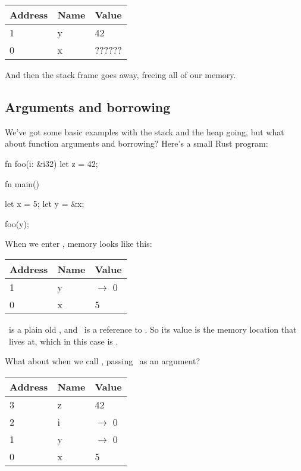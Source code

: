 \begin{table}[H]
  \begin{tabular}{|l|l|l|}
    \hline
    \textbf{Address} & \textbf{Name} & \textbf{Value} \\
    \hline
    1 & y & 42 \\
    \hline
    0 & x & ?????? \\
    \hline
  \end{tabular}
\end{table}

And then the stack frame goes away, freeing all of our memory.

\subsection*{Arguments and borrowing}

We've got some basic examples with the stack and the heap going, but what about function arguments and borrowing? Here's a small 
Rust program:

\begin{rustc}
fn foo(i: &i32) {
    let z = 42;
}

fn main() {
    let x = 5;
    let y = &x;

    foo(y);
}
\end{rustc}

When we enter , memory looks like this:

\begin{table}[H]
  \begin{tabular}{|l|l|l|}
    \hline
    \textbf{Address} & \textbf{Name} & \textbf{Value} \\
    \hline
    1 & y & $\rightarrow$ 0 \\
    \hline
    0 & x & 5 \\
    \hline
  \end{tabular}
\end{table}

\x\ is a plain old , and \y\ is a reference to \x. So its value is the memory location that \x\ lives at, which in this 
case is .

\blank

What about when we call , passing \y\ as an argument?

\begin{table}[H]
  \begin{tabular}{|l|l|l|}
    \hline
    \textbf{Address} & \textbf{Name} & \textbf{Value} \\
    \hline
    3 & z & 42 \\
    \hline
    2 & i & $\rightarrow$ 0 \\
    \hline
    1 & y & $\rightarrow$ 0 \\
    \hline
    0 & x & 5 \\
    \hline
  \end{tabular}
\end{table}

